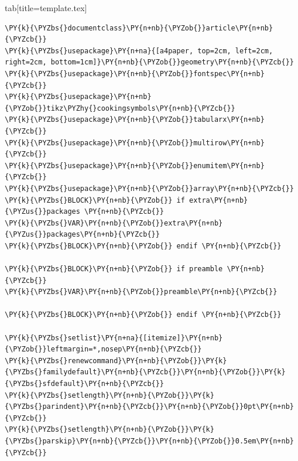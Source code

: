 \documentclass[a4paper,twoside]{article}
\begin{document}
\begin{tsdiv}{tab}[title=template.tex]
\begin{tscode}[lang=tex, engine=pygments]
\begin{Verbatim}[commandchars=\\\{\},breaklines, breakanywhere, commandchars=\\\{\}]
\PY{k}{\PYZbs{}documentclass}\PY{n+nb}{\PYZob{}}article\PY{n+nb}{\PYZcb{}}
\PY{k}{\PYZbs{}usepackage}\PY{n+na}{[a4paper, top=2cm, left=2cm, right=2cm, bottom=1cm]}\PY{n+nb}{\PYZob{}}geometry\PY{n+nb}{\PYZcb{}}
\PY{k}{\PYZbs{}usepackage}\PY{n+nb}{\PYZob{}}fontspec\PY{n+nb}{\PYZcb{}}
\PY{k}{\PYZbs{}usepackage}\PY{n+nb}{\PYZob{}}tikz\PYZhy{}cookingsymbols\PY{n+nb}{\PYZcb{}}
\PY{k}{\PYZbs{}usepackage}\PY{n+nb}{\PYZob{}}tabularx\PY{n+nb}{\PYZcb{}}
\PY{k}{\PYZbs{}usepackage}\PY{n+nb}{\PYZob{}}multirow\PY{n+nb}{\PYZcb{}}
\PY{k}{\PYZbs{}usepackage}\PY{n+nb}{\PYZob{}}enumitem\PY{n+nb}{\PYZcb{}}
\PY{k}{\PYZbs{}usepackage}\PY{n+nb}{\PYZob{}}array\PY{n+nb}{\PYZcb{}}
\PY{k}{\PYZbs{}BLOCK}\PY{n+nb}{\PYZob{}} if extra\PY{n+nb}{\PYZus{}}packages \PY{n+nb}{\PYZcb{}}
\PY{k}{\PYZbs{}VAR}\PY{n+nb}{\PYZob{}}extra\PY{n+nb}{\PYZus{}}packages\PY{n+nb}{\PYZcb{}}
\PY{k}{\PYZbs{}BLOCK}\PY{n+nb}{\PYZob{}} endif \PY{n+nb}{\PYZcb{}}

\PY{k}{\PYZbs{}BLOCK}\PY{n+nb}{\PYZob{}} if preamble \PY{n+nb}{\PYZcb{}}
\PY{k}{\PYZbs{}VAR}\PY{n+nb}{\PYZob{}}preamble\PY{n+nb}{\PYZcb{}}

\PY{k}{\PYZbs{}BLOCK}\PY{n+nb}{\PYZob{}} endif \PY{n+nb}{\PYZcb{}}

\PY{k}{\PYZbs{}setlist}\PY{n+na}{[itemize]}\PY{n+nb}{\PYZob{}}leftmargin=*,nosep\PY{n+nb}{\PYZcb{}}
\PY{k}{\PYZbs{}renewcommand}\PY{n+nb}{\PYZob{}}\PY{k}{\PYZbs{}familydefault}\PY{n+nb}{\PYZcb{}}\PY{n+nb}{\PYZob{}}\PY{k}{\PYZbs{}sfdefault}\PY{n+nb}{\PYZcb{}}
\PY{k}{\PYZbs{}setlength}\PY{n+nb}{\PYZob{}}\PY{k}{\PYZbs{}parindent}\PY{n+nb}{\PYZcb{}}\PY{n+nb}{\PYZob{}}0pt\PY{n+nb}{\PYZcb{}}
\PY{k}{\PYZbs{}setlength}\PY{n+nb}{\PYZob{}}\PY{k}{\PYZbs{}parskip}\PY{n+nb}{\PYZcb{}}\PY{n+nb}{\PYZob{}}0.5em\PY{n+nb}{\PYZcb{}}


\end{Verbatim}
\end{tscode}
\end{tsdiv}
\end{document}
